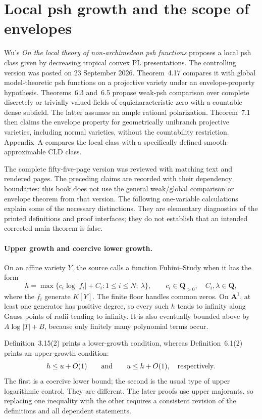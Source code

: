 \section{Local psh growth and the scope of envelopes}
\label{sec:appL-local-psh-growth-boundary}

Wu's \emph{On the local theory of non-archimedean psh functions}
\cite{Wu26LocalNApshV1} proposes a local psh class given by decreasing
tropical convex PL presentations. The controlling version was posted
on 23 September 2026. Theorem~4.17 compares it with global model-theoretic psh
functions on a projective variety under an envelope-property hypothesis.
Theorems~6.3 and~6.5 propose weak-psh comparison over complete discretely
or trivially valued fields of equicharacteristic zero with a countable
dense subfield. The latter assumes an ample rational polarization.
Theorem~7.1 then claims the envelope property for geometrically unibranch
projective varieties, including normal varieties, without the countability
restriction. Appendix~A compares the local class with a specifically
defined smooth-approximable CLD class.

The complete fifty-five-page version was reviewed with matching text
and rendered pages. The preceding claims are recorded with their
dependency boundaries: this book does not use the general weak/global
comparison or envelope theorem from that version. The following
one-variable calculations explain some of the necessary distinctions.
They are elementary diagnostics of the printed definitions and proof
interfaces; they do not establish that an intended corrected main
theorem is false.

\paragraph{Upper growth and coercive lower growth.}
On an affine variety \(Y\), the source calls a function Fubini--Study
when it has the form
\[
 h=\max\{c_i\log|f_i|+C_i:1\leq i\leq N;\ \lambda\},
 \qquad c_i\in\mathbf Q_{>0},\quad C_i,\lambda\in\mathbf Q,
\]
where the \(f_i\) generate \(K[Y]\). The finite floor handles common
zeros. On \(\mathbf A^1\), at least one generator has positive degree,
so every such \(h\) tends to infinity along Gauss points of radii
tending to infinity. It is also eventually bounded above by
\(A\log|T|+B\), because only finitely many polynomial terms occur.

Definition~3.15(2) prints a lower-growth condition, whereas
Definition~6.1(2) prints an upper-growth condition:
\[
 h\leq u+O(1)
 \qquad\hbox{and}\qquad
 u\leq h+O(1),
 \quad\hbox{respectively}.
\]
The first is a coercive lower bound; the second is the usual type of
upper logarithmic control. They are different. The later proofs use
upper majorants, so replacing one inequality with the other requires a
consistent revision of the definitions and all dependent statements.

